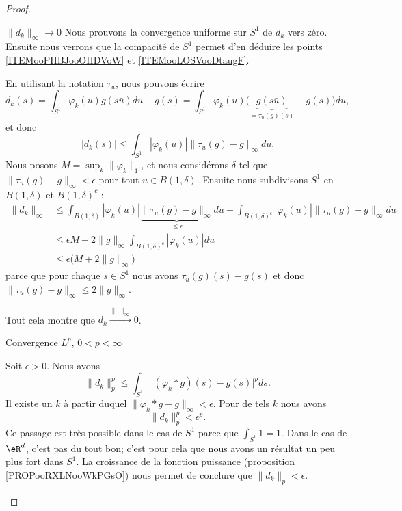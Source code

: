 \begin{proof}
\begin{subproof}
        \item[\( \| d_k \|_{\infty}\to 0\)]
            Nous prouvons la convergence uniforme sur \( S^1\) de \( d_k\) vers zéro. Ensuite nous verrons que la compacité de \( S^1\) permet d'en déduire les points \ref{ITEMooPHBJooOHDVoW} et \ref{ITEMooLOSVooDtaugF}.
            
            En utilisant la notation \( \tau_u\), nous pouvons écrire
            \begin{equation}
                d_k(s)=\int_{S^1}\varphi_k(u)g(s\bar u)du-g(s)=\int_{S^1}\varphi_k(u)\big( \underbrace{ g(s\bar u)}_{=\tau_u(g)(s)}-g(s) \big)du,
            \end{equation}
            et donc
            \begin{equation}
                | d_k(s) |\leq \int_{S^1}| \varphi_k(u) |\| \tau_u(g)-g \|_{\infty}du.
            \end{equation}
            Nous posons \( M=\sup_k\| \varphi_k \|_1\), et nous considérons \( \delta\) tel que \( \| \tau_u(g)-g \|_{\infty}<\epsilon\) pour tout \( u\in B(1,\delta)\). Ensuite nous subdivisons \( S^1\) en \( B(1,\delta)\) et \( B(1,\delta)^c\) :
            \begin{subequations}
                \begin{align}
                    \| d_k \|_{\infty}&\leq \int_{B(1,\delta)}| \varphi_k(u) |\underbrace{\| \tau_u(g)-g \|_{\infty}}_{\leq \epsilon}du+\int_{B(1,\delta)^c}| \varphi_k(u) |\| \tau_u(g)-g \|_{\infty}du\\
                    &\leq\epsilon M+2\| g \|_{\infty}\int_{B(1,\delta)^c}| \varphi_k(u) |du\\
                    &\leq \epsilon\big( M+2\| g \|_{\infty} \big)
                \end{align}
            \end{subequations}
            parce que pour chaque \( s\in S^1\) nous avons \( \tau_u(g)(s)-g(s)\) et donc \( \| \tau_u(g)-g \|_{\infty}\leq 2\| g \|_{\infty}\).

            Tout cela montre que \( d_k\stackrel{\| . \|_{\infty}}{\longrightarrow}0\).

        \item[Convergence \( L^p\), \( 0<p<\infty\)]

            Soit \( \epsilon>0\). Nous avons
            \begin{equation}
                \| d_k \|_p^p\leq \int_{S^1}\big| (\varphi_k*g)(s)-g(s) \big|^pds.
            \end{equation}
            Il existe un \( k\) à partir duquel \( \| \varphi_k*g-g \|_{\infty}<\epsilon\). Pour de tels \( k\) nous avons 
            \begin{equation}
                \| d_k \|_p^p<\epsilon^p.
            \end{equation}
            Ce passage est très possible dans le cas de \( S^1\) parce que \( \int_{S^1}1=1\). Dans le cas de \( \eR^d\), c'est pas du tout bon; c'est pour cela que nous avons un résultat un peu plus fort dans \( S^1\). La croissance de la fonction puissance (proposition \ref{PROPooRXLNooWkPGsO}) nous permet de conclure que \( \| d_k \|_p<\epsilon\).


\end{subproof}
\end{proof}
